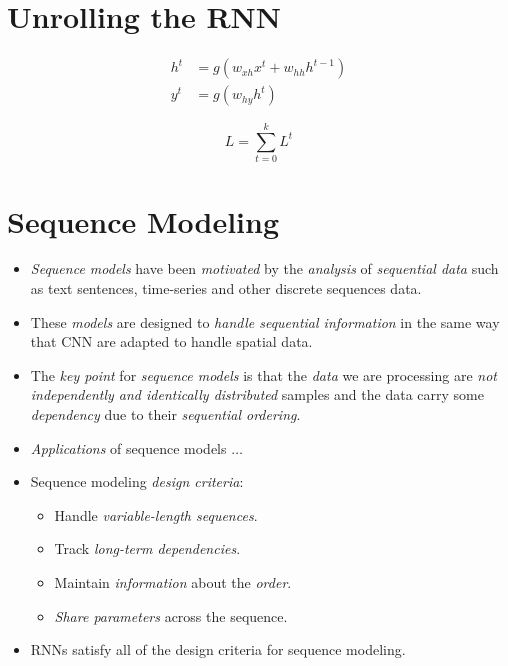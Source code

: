 \documentclass[
	number={10},
	title={Recurrent Neural Networks}
]{cs584notes}
\begin{document}
\section{Unrolling the RNN}\label{sec:unrolling-the-rnn}
\begin{equation}
	\begin{aligned}
		h^{t} &= g(w_{xh}x^{t} + w_{hh}h^{t-1})\\
		y^{t} &= g(w_{hy}h^{t})
	\end{aligned}
	\label{eq:hidden}
\end{equation}

\begin{equation}
	L = \sum_{t=0}^{k} L^{t}
	\label{eq:rnn-loss}
\end{equation}

\section{Sequence Modeling}\label{sec:sequence-modeling}
\begin{itemize}
	\item \emph{Sequence models} have been \emph{motivated} by the \emph{analysis} of \emph{sequential data} such as text sentences, time-series and other discrete sequences data.
	\item These \emph{models} are designed to \emph{handle sequential information} in the same way that CNN are adapted to handle spatial data.
	\item The \emph{key point} for \emph{sequence models} is that the \emph{data} we are processing are \emph{not independently and identically distributed} samples and the data carry some \emph{dependency} due to their \emph{sequential ordering}.
	\item \emph{Applications} of sequence models $\dots$
	\item Sequence modeling \emph{design criteria}:
	\begin{itemize}
		\item Handle \emph{variable-length sequences}.
		\item Track \emph{long-term dependencies}.
		\item Maintain \emph{information} about the \emph{order}.
		\item \emph{Share parameters} across the sequence.
	\end{itemize}
	\item RNNs satisfy all of the design criteria for sequence modeling.
\end{itemize}
\end{document}
